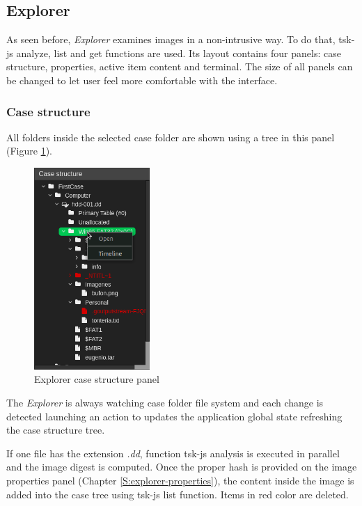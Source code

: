 \subsection{Explorer}

As seen before, \textit{Explorer} examines images in a non-intrusive way. To do
that, tsk-js analyze, list and get functions are used. Its layout contains four
panels: case structure, properties, active item content and terminal. The size
of all panels can be changed to let user feel more comfortable with the 
interface.

\subsubsection{Case structure}
\label{S:case-structure}

All folders inside the selected case folder are shown using a tree in this 
panel (Figure \ref{F:img-spy-explorer-case-structure}).

\begin{figure}
	\includegraphics[width=4.4cm]{./figures/explorer-case-structure.png}
	\centering
	\caption{Explorer case structure panel}
	\label{F:img-spy-explorer-case-structure}
\end{figure}

The \textit{Explorer} is always watching case folder file system and each
change is detected launching an action to updates the application global state
refreshing the case structure tree. 

If one file has the extension \textit{.dd}, function tsk-js analysis is
executed in parallel and the image digest is computed. Once the proper hash is
provided on the image properties panel (Chapter \ref{S:explorer-properties}),
the content inside the image is added into the case tree using tsk-js list
function. Items in red color are deleted.

